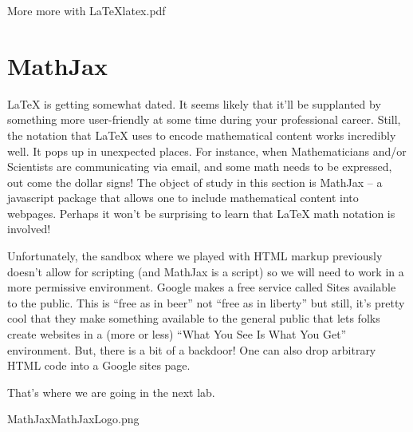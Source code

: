 \clearpage
\begin{worksheet}{4}{More more with \LaTeX}{latex.pdf}

\end{worksheet}
\clearpage

\section{MathJax}
\label{sec:mathjax}

\LaTeX{} is getting somewhat dated.  It seems likely that it'll be supplanted by something more user-friendly at some time during your professional career.  Still, the notation that \LaTeX{} uses to encode mathematical content works incredibly well.  It pops up in unexpected places.  For instance, when Mathematicians and/or Scientists are communicating via email, and some math needs to be expressed, out come the dollar signs!  The object of study in this section is MathJax -- a javascript package that allows one to include mathematical content into webpages.  Perhaps it won't be surprising to learn that \LaTeX{} math notation is involved!

Unfortunately, the sandbox where we played with HTML markup previously doesn't allow for scripting (and MathJax is a script) so we will need to work in a more permissive environment.  Google makes a free service called Sites available to the public.  This is ``free as in beer'' not ``free as in liberty'' but still, it's pretty cool that they make something available to the general public that lets folks create websites in a (more or less) ``What You See Is What You Get'' environment.  But, there is a bit of a backdoor!  One can also drop arbitrary HTML code into a Google sites page.  

That's where we are going in the next lab.

\clearpage
\begin{worksheet}{5}{MathJax}{MathJaxLogo.png}

\end{worksheet}
\clearpage



